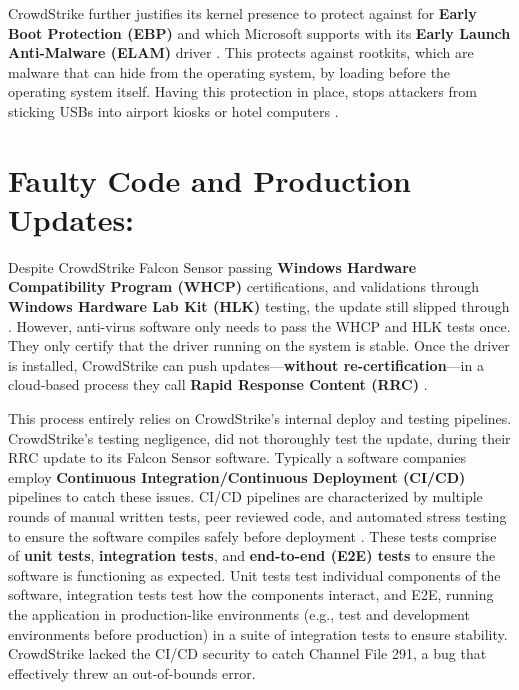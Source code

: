 CrowdStrike further justifies its kernel presence to protect against for \textbf{Early Boot Protection (EBP)} and which 
Microsoft supports with its \textbf{Early Launch Anti-Malware (ELAM)} driver \cite{ionescu_kernel_access_2024}. This protects against rootkits, which are 
malware that can hide from the operating system, by loading before the operating system itself. Having this 
protection in place, stops attackers from sticking USBs into airport kiosks or hotel computers \cite{baker_rootkits_2023}.

\section{Faulty Code and Production Updates:}

Despite CrowdStrike Falcon Sensor passing \textbf{Windows Hardware Compatibility Program (WHCP)} certifications, and 
validations through \textbf{Windows Hardware Lab Kit (HLK)} testing, the update still slipped through \cite{microsoftwhcpcertification}.
However, anti-virus software only needs to pass the WHCP and HLK tests once. They only certify that the driver running on the system 
is stable. Once the driver is installed, CrowdStrike can push updates---\textbf{without re-certification}---in a cloud-based process they call 
\textbf{Rapid Response Content (RRC)} \cite{crowdstrikechannelfile291rca}.

This process entirely relies on CrowdStrike's internal deploy and testing pipelines. CrowdStrike's testing negligence, did not thoroughly test the update,
during their RRC update to its Falcon Sensor software. Typically a software companies employ \textbf{Continuous Integration/Continuous Deployment (CI/CD)} pipelines
to catch these issues. CI/CD pipelines are characterized by multiple rounds of manual written tests, peer reviewed code, and automated stress testing to ensure the software compiles safely before deployment \cite{redhat_cicd_2023}.
These tests comprise of \textbf{unit tests}, \textbf{integration tests}, and \textbf{end-to-end (E2E) tests} to ensure the software is functioning as expected. 
Unit tests test individual components of the software, integration tests test how the components interact, and E2E, running the application in production-like environments (e.g., test and development environments before production) in 
a suite of integration tests to ensure stability. CrowdStrike lacked the CI/CD security to catch Channel File 291, a bug that effectively threw an out-of-bounds error.

